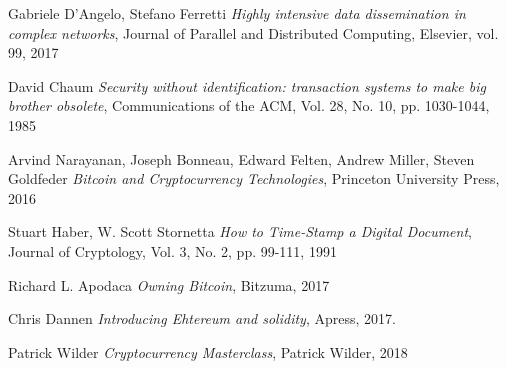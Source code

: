 \begin{thebibliography}{99}

 Gabriele D'Angelo, Stefano Ferretti
{\em Highly intensive data dissemination in complex networks},
Journal of Parallel and Distributed Computing, Elsevier, vol. 99, 2017

 David Chaum
{\em Security without identification: transaction systems to make big brother obsolete},
Communications of the ACM, Vol. 28, No. 10, pp. 1030-1044, 1985

 Arvind Narayanan, Joseph Bonneau, Edward Felten, Andrew Miller, Steven Goldfeder
{\em Bitcoin and Cryptocurrency Technologies},
Princeton University Press, 2016

 Stuart Haber, W. Scott Stornetta
{\em How to Time-Stamp a Digital Document},
Journal of Cryptology, Vol. 3, No. 2, pp. 99-111, 1991

 Richard L. Apodaca
{\em Owning Bitcoin},
Bitzuma, 2017

 Chris Dannen
{\em Introducing Ehtereum and solidity},
Apress, 2017.

 Patrick Wilder
{\em Cryptocurrency Masterclass},
Patrick Wilder, 2018

\end{thebibliography}
